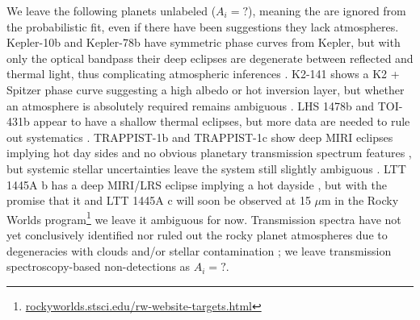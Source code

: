 \documentclass[modern,linenumbers,trackchanges]{aastex7}
\begin{document}
We leave the following planets unlabeled ($A_i = ?$), meaning the are ignored from the probabilistic fit, even if there have been suggestions they lack atmospheres. 
Kepler-10b and Kepler-78b have symmetric phase curves from Kepler, but with only the optical bandpass their deep eclipses are degenerate between reflected and thermal light, thus complicating atmospheric inferences \citep{sanchis-ojedaTransitsOccultationsEarthsized2013, estevesChangingPhasesAlien2015a, huSemianalyticalModelVisiblewavelength2015, singhProbingKeplersHottest2022}. K2-141 shows a K2 + Spitzer phase curve suggesting a high albedo or hot inversion layer, but whether an atmosphere is absolutely required remains ambiguous \citep{singhProbingKeplersHottest2022, ziebaK2SpitzerPhase2022}. LHS 1478b and TOI-431b appear to have a shallow thermal eclipses, but more data are needed to rule out systematics \citep{augustHotRocksSurvey2025, monaghanLow45Mm2025a}. TRAPPIST-1b and TRAPPIST-1c show deep MIRI eclipses implying hot day sides \citep{greeneThermalEmissionEarthsized2023, ihConstrainingThicknessTRAPPIST12023, ziebaNoThickCarbon2023, ducrotCombinedAnalysis1282025} and no obvious planetary transmission spectrum features \citep{limAtmosphericReconnaissanceTRAPPIST12023, radicaPromisePerilStellar2025, rathckeStellarContaminationCorrection2025}, but systemic stellar uncertainties leave the system still slightly ambiguous \citep{howardCharacterizingNearinfraredSpectra2023, rackhamRobustCorrectionsStellar2024,  fauchezStellarModelsAlso2025}. LTT 1445A b has a deep MIRI/LRS eclipse implying a hot dayside \citep{wachiraphanThermalEmissionSpectrum2025a}, but with the promise that it and LTT 1445A c \citep{passHSTWFC3Light2023} will soon be observed at 15 $\mu$m in the Rocky Worlds program\footnote{\href{https://rockyworlds.stsci.edu/rw-website-targets.html}{rockyworlds.stsci.edu/rw-website-targets.html}} we leave it ambiguous for now. Transmission spectra have not yet conclusively identified nor ruled out the rocky planet atmospheres due to degeneracies with clouds \citep{lustig-yaegerMirageCosmicShoreline2019} and/or stellar contamination \citep{mayDoubleTroubleTwo2023, moranHighTideRiptide2023}; we leave transmission spectroscopy-based non-detections as $A_i = ?$.

%
%
\end{document}
